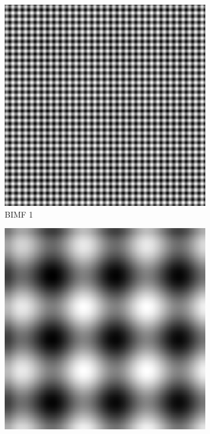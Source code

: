 \begin{figure}
\centering
\begin{subfigure}{.30\textwidth}
  \centering
  \includegraphics[width=.9\linewidth]{img/s_1_4_1}
  \caption{BIMF 1}
\end{subfigure}
\begin{subfigure}{.30\textwidth}
  \centering
  \includegraphics[width=.9\linewidth]{img/s_1_4_2}

\end{subfigure}
\end{figure}
